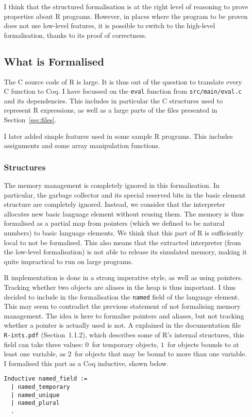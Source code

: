 \documentclass{article}
\newcommand\Coq{Coq}
\newcommand\R{R}
\newcommand\Cn{C}
\begin{document}
I think that the structured formalisation
is at the right level of reasoning to prove properties
about \R{} programs.
However, in places where the program to be proven does
not use low-level features,
it is possible to switch to the high-level formalisation,
thanks to its proof of correctness.


\subsection{What is Formalised}
\label{sec:formalisation:coverage}

The \Cn{} source code of \R{} is large.
It is thus out of the question to translate every \Cn{} function to \Coq{}.
I have focussed on the \texttt{eval} function from
\texttt{src/main/eval.c} and its dependencies.
This includes in particular the \Cn{} structures used to represent
\R{} expressions,
as well as a large parts of the files presented in Section~\ref{sec:files}.

I later added simple features used in some sample \R{} programs.
This includes assignments and some array manipulation functions.

\subsubsection{Structures}
\label{sec:coverage:structures}

The memory management is completely ignored in this formalisation.
In particular, the garbage collector and its special reserved bits in the
basic element structure are completely ignored.
Instead, we consider that the interpreter allocates new basic language element
without reusing them.
The memory is thus formalised as a partial map from pointers
(which we defined to be natural numbers)
to basic language elements.
We think that this part of \R{} is sufficiently local
to not be formalised.
This also means that the extracted interpreter
(from the low-level formalisation)
is not able to release its simulated memory,
making it quite impractical to run on large programs.

\R{} implementation is done in a strong imperative style,
as well as using pointers.
Tracking whether two objects are aliases in the heap is thus important.
I thus decided to include in the formalisation the \texttt{named}
field of the language element.
This may seem to contradict the previous statement of not formalising
memory management.
The idea is here to formalise pointers and aliases,
but not tracking whether a pointer is actually used is not.
%
A explained in the documentation file \texttt{R-ints.pdf}
(Section~1.1.2),
which describes some of \R{}'s internal structures,
this field can take three values:
\(0\)~for temporary objects,
\(1\)~for objects bounds to at least one variable,
as \(2\)~for objects that may be bound to more than one variable.
I formalised this part as a \Coq{} inductive, shown below.
\begin{verbatim}
Inductive named_field :=
  | named_temporary
  | named_unique
  | named_plural
  .
\end{verbatim}
\end{document}
